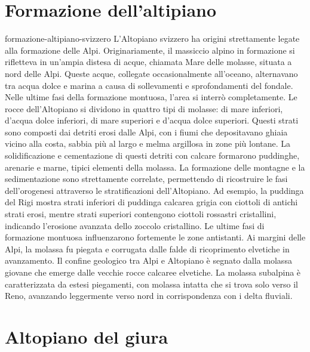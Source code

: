\documentclass[preview]{standalone}
\begin{document}
\genpage

\section{Formazione dell'altipiano}

\begin{snippet}{formazione-altipiano-svizzero}
    L'Altopiano svizzero ha origini strettamente legate alla formazione delle Alpi. Originariamente, il
    massiccio alpino in formazione si rifletteva in un'ampia distesa di acque, chiamata Mare delle
    molasse, situata a nord delle Alpi. Queste acque, collegate occasionalmente all'oceano,
    alternavano tra acqua dolce e marina a causa di sollevamenti e sprofondamenti del fondale. Nelle
    ultime fasi della formazione montuosa, l'area si interrò completamente. Le rocce dell'Altopiano si
    dividono in quattro tipi di molasse: di mare inferiori, d'acqua dolce inferiori, di mare superiori e
    d'acqua dolce superiori. Questi strati sono composti dai detriti erosi dalle Alpi, con i fiumi che
    depositavano ghiaia vicino alla costa, sabbia più al largo e melma argillosa in zone più lontane. La
    solidificazione e cementazione di questi detriti con calcare formarono puddinghe, arenarie e
    marne, tipici elementi della molassa. La formazione delle montagne e la sedimentazione sono
    strettamente correlate, permettendo di ricostruire le fasi dell'orogenesi attraverso le stratificazioni
    dell'Altopiano. Ad esempio, la puddinga del Rigi mostra strati inferiori di puddinga calcarea grigia
    con ciottoli di antichi strati erosi, mentre strati superiori contengono ciottoli rossastri cristallini,
    indicando l'erosione avanzata dello zoccolo cristallino. Le ultime fasi di formazione montuosa
    influenzarono fortemente le zone antistanti. Ai margini delle Alpi, la molassa fu piegata e corrugata
    dalle falde di ricoprimento elvetiche in avanzamento. Il confine geologico tra Alpi e Altopiano è
    segnato dalla molassa giovane che emerge dalle vecchie rocce calcaree elvetiche. La molassa
    subalpina è caratterizzata da estesi piegamenti, con molassa intatta che si trova solo verso il Reno,
    avanzando leggermente verso nord in corrispondenza con i delta fluviali.
\end{snippet}

\section{Altopiano del giura}
\end{document}
